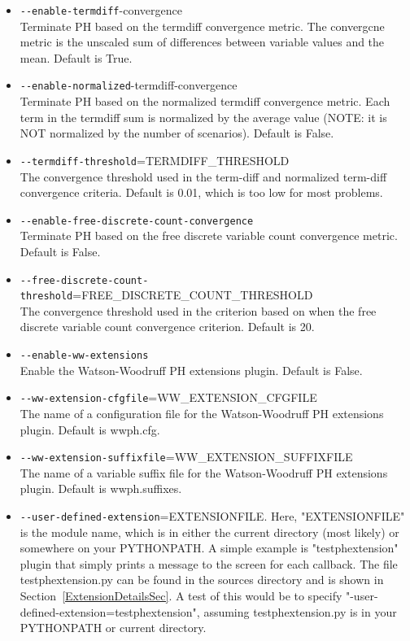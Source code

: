 \begin{itemize}
  \item \verb|--enable-termdiff|-convergence\\
                        Terminate PH based on the termdiff convergence metric. The convergcne metric is the unscaled sum of differences between variable values and the mean. Default is True.
  \item \verb|--enable-normalized|-termdiff-convergence\\
                        Terminate PH based on the normalized termdiff
                        convergence metric. Each term in the termdiff sum is normalized by the average value (NOTE: it is NOT normalized by the number of scenarios). Default is False.
  \item \verb|--termdiff-threshold|=TERMDIFF\_THRESHOLD\\
                        The convergence threshold used in the term-diff and
                        normalized term-diff convergence criteria. Default is
                        0.01, which is too low for most problems. 
  \item \verb|--enable-free-discrete-count-convergence|\\
                        Terminate PH based on the free discrete variable count convergence metric. Default is False.
  \item \verb|--free-discrete-count-threshold|=FREE\_DISCRETE\_COUNT\_THRESHOLD\\
                        The convergence threshold used in the criterion based on when the free discrete variable count convergence criterion. Default is 20.
  \item \verb|--enable-ww-extensions|\\
                        Enable the Watson-Woodruff PH extensions plugin. Default is False.
  \item \verb|--ww-extension-cfgfile|=WW\_EXTENSION\_CFGFILE\\
                        The name of a configuration file for the Watson-Woodruff PH extensions plugin. Default is wwph.cfg.
  \item \verb|--ww-extension-suffixfile|=WW\_EXTENSION\_SUFFIXFILE\\
                        The name of a variable suffix file for the Watson-Woodruff PH extensions plugin. Default is wwph.suffixes.
   \item \verb|--user-defined-extension|=EXTENSIONFILE. Here, "EXTENSIONFILE" is the module name, which is in either the current directory (most likely) or somewhere on your PYTHONPATH. A simple example is "testphextension" plugin that simply prints a message to the screen for each callback. The file testphextension.py can be found in the sources directory and is shown in Section~\ref{ExtensionDetailsSec}. A test of this would be to specify "-user-defined-extension=testphextension", assuming testphextension.py is in your PYTHONPATH or current directory.
 

\end{itemize}
